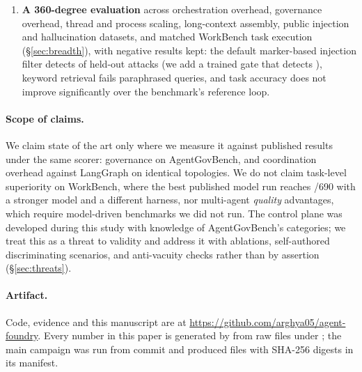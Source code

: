 \begin{enumerate}
\item \textbf{A 360-degree evaluation} across orchestration overhead, governance overhead, thread and process scaling, long-context assembly, public injection and hallucination datasets, and matched WorkBench task execution (\S\ref{sec:breadth}), with negative results kept: the default marker-based injection filter detects \InjRegexRecall{} of held-out attacks (we add a trained gate that detects \InjNBRecall{}), keyword retrieval fails paraphrased queries, and task accuracy does not improve significantly over the benchmark's reference loop.
\end{enumerate}

\paragraph{Scope of claims.}
We claim state of the art only where we measure it against published results under the same scorer: governance on AgentGovBench, and coordination overhead against LangGraph on identical topologies. We do not claim task-level superiority on WorkBench, where the best published model run reaches \WBFrontierCorrect{}/690 with a stronger model and a different harness, nor multi-agent \emph{quality} advantages, which require model-driven benchmarks we did not run. The control plane was developed during this study with knowledge of AgentGovBench's categories; we treat this as a threat to validity and address it with ablations, self-authored discriminating scenarios, and anti-vacuity checks rather than by assertion (\S\ref{sec:threats}).

\paragraph{Artifact.}
Code, evidence and this manuscript are at \url{https://github.com/arghya05/agent-foundry}. Every number in this paper is generated by  from raw files under ; the main campaign was run from commit \code{\CampaignCommit{}} and produced \CampaignFiles{} files with SHA-256 digests in its manifest.
